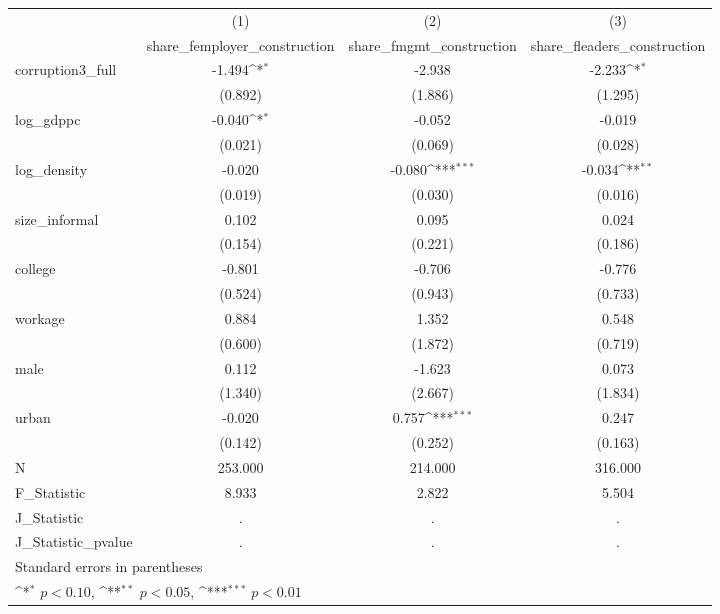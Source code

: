 {
\def\sym#1{\ifmmode^{#1}\else\(^{#1}\)\fi}
\begin{tabular}{l*{3}{c}}
\hline\hline
            &\multicolumn{1}{c}{(1)}&\multicolumn{1}{c}{(2)}&\multicolumn{1}{c}{(3)}\\
            &\multicolumn{1}{c}{share\_femployer\_construction}&\multicolumn{1}{c}{share\_fmgmt\_construction}&\multicolumn{1}{c}{share\_fleaders\_construction}\\
\hline
corruption3\_full&      -1.494\sym{*}  &      -2.938         &      -2.233\sym{*}  \\
            &     (0.892)         &     (1.886)         &     (1.295)         \\
[1em]
log\_gdppc   &      -0.040\sym{*}  &      -0.052         &      -0.019         \\
            &     (0.021)         &     (0.069)         &     (0.028)         \\
[1em]
log\_density &      -0.020         &      -0.080\sym{***}&      -0.034\sym{**} \\
            &     (0.019)         &     (0.030)         &     (0.016)         \\
[1em]
size\_informal&       0.102         &       0.095         &       0.024         \\
            &     (0.154)         &     (0.221)         &     (0.186)         \\
[1em]
college     &      -0.801         &      -0.706         &      -0.776         \\
            &     (0.524)         &     (0.943)         &     (0.733)         \\
[1em]
workage     &       0.884         &       1.352         &       0.548         \\
            &     (0.600)         &     (1.872)         &     (0.719)         \\
[1em]
male        &       0.112         &      -1.623         &       0.073         \\
            &     (1.340)         &     (2.667)         &     (1.834)         \\
[1em]
urban       &      -0.020         &       0.757\sym{***}&       0.247         \\
            &     (0.142)         &     (0.252)         &     (0.163)         \\
\hline
N           &     253.000         &     214.000         &     316.000         \\
F\_Statistic &       8.933         &       2.822         &       5.504         \\
J\_Statistic &           .         &           .         &           .         \\
J\_Statistic\_pvalue&           .         &           .         &           .         \\
\hline\hline
\multicolumn{4}{l}{\footnotesize Standard errors in parentheses}\\
\multicolumn{4}{l}{\footnotesize \sym{*} \(p<0.10\), \sym{**} \(p<0.05\), \sym{***} \(p<0.01\)}\\
\end{tabular}
}

